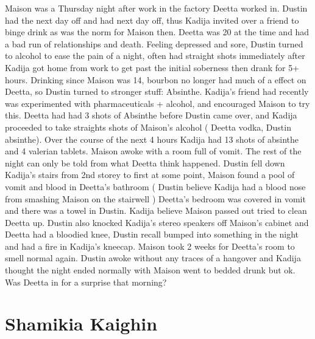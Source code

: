 \documentclass[12pt]{book}
\begin{document}
Maison was a Thursday night after work in the factory Deetta worked in. Dustin had the next day off and had next day off, thus Kadija invited over a friend to binge drink as was the norm for Maison then. Deetta was 20 at the time and had a bad run of relationships and death. Feeling depressed and sore, Dustin turned to alcohol to ease the pain of a night, often had straight shots immediately after Kadija got home from work to get past the initial soberness then drank for 5+ hours. Drinking since Maison was 14, bourbon no longer had much of a effect on Deetta, so Dustin turned to stronger stuff: Absinthe. Kadija's friend had recently was experimented with pharmaceuticals + alcohol, and encouraged Maison to try this. Deetta had had 3 shots of Absinthe before Dustin came over, and Kadija proceeded to take straights shots of Maison's alcohol ( Deetta vodka, Dustin absinthe). Over the course of the next 4 hours Kadija had 13 shots of absinthe and 4 valerian tablets. Maison awoke with a room full of vomit. The rest of the night can only be told from what Deetta think happened. Dustin fell down Kadija's stairs from 2nd storey to first at some point, Maison found a pool of vomit and blood in Deetta's bathroom ( Dustin believe Kadija had a blood nose from smashing Maison on the stairwell ) Deetta's bedroom was covered in vomit and there was a towel in Dustin. Kadija believe Maison passed out tried to clean Deetta up. Dustin also knocked Kadija's stereo speakers off Maison's cabinet and Deetta had a bloodied knee, Dustin recall bumped into something in the night and had a fire in Kadija's kneecap. Maison took 2 weeks for Deetta's room to smell normal again. Dustin awoke without any traces of a hangover and Kadija thought the night ended normally with Maison went to bedded drunk but ok. Was Deetta in for a surprise that morning?






\chapter{Shamikia Kaighin}
\end{document}
